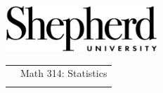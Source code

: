 \documentclass[10pt]{article}
\begin{document}
\pagestyle{empty}

\href{http://www.shepherd.edu}{\includegraphics[height=1.75cm]{logo-high-res.eps}}
\vspace{-1.69cm}

{\small
\begin{tabular}{cl}
\hspace{5in} & Math 314:  Statistics\\
                & %
\end{tabular}
}
\medskip
\end{document}

